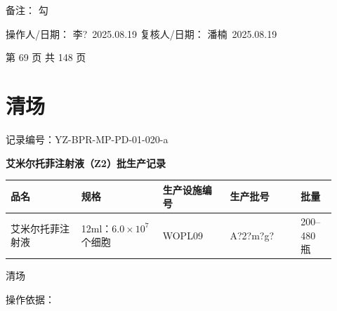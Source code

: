 \documentclass[UTF8,10pt,a4paper,fontset=fandol]{ctexart}
\newcommand{\fieldvalue}[1]{#1}
\newcommand{\handwritten}[1]{#1}
\begin{document}
\medskip

\noindent
备注：%
\fieldvalue{\handwritten{勾}}

\medskip

\noindent
操作人/日期：%
\fieldvalue{\handwritten{李?\ 2025.08.19}}
\hfill
复核人/日期：%
\fieldvalue{\handwritten{潘楠\ 2025.08.19}}

\bigskip

\begin{center}
第 69 页 共 148 页
\end{center}

\newpage

\section{清场}

\noindent
记录编号：YZ-BPR-MP-PD-01-020-a

\begin{center}
\textbf{艾米尔托菲注射液（Z2）批生产记录}
\end{center}

\begin{center}
\small
\begin{tabular}{|p{0.20\linewidth}|p{0.23\linewidth}|p{0.19\linewidth}|p{0.20\linewidth}|p{0.10\linewidth}|}
\hline
品名 & 规格 & 生产设施编号 & 生产批号 & 批量 \\
\hline
\fieldvalue{艾米尔托菲注射液}
&
\fieldvalue{12ml：$6.0\times10^{7}$个细胞}
&
\fieldvalue{\handwritten{WOPL09}}
&
\fieldvalue{\handwritten{A?2?m?g?}}
&
\fieldvalue{200--480 瓶}
\\
\hline
\end{tabular}
\end{center}

 清场

\noindent
操作依据：
\end{document}
